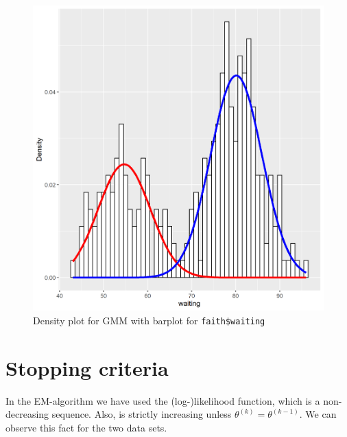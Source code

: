 \begin{figure}[h]
\centering
\includegraphics[scale=0.75, keepaspectratio]{ex5/5faith_wait_mix.png}
\caption{Density plot for  GMM with barplot for \texttt{faith\$waiting}}
\label{5faith_wait_mix}
\end{figure}



\section{Stopping criteria}
In the EM-algorithm we have used the (log-)likelihood function, which is a non-decreasing sequence. Also, is strictly increasing unless $\theta^{(k)} = \theta^{(k-1)}.$ We can observe this fact for the two data sets.


